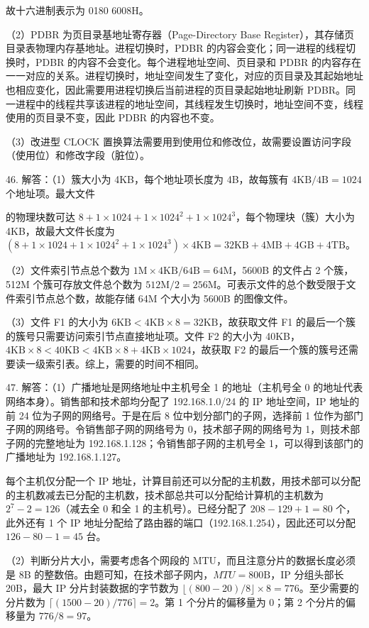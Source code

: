 \documentclass[UTF8,11pt]{ctexart}
\begin{document}
故十六进制表示为 0180 6008H。


（2）PDBR 为页目录基地址寄存器（Page-Directory Base Register），其存储页目录表物理内存基地址。进程切换时，PDBR 的内容会变化；同一进程的线程切换时，PDBR 的内容不会变化。每个进程地址空间、页目录和 PDBR 的内容存在一一对应的关系。进程切换时，地址空间发生了变化，对应的页目录及其起始地址也相应变化，因此需要用进程切换后当前进程的页目录起始地址刷新 PDBR。同一进程中的线程共享该进程的地址空间，其线程发生切换时，地址空间不变，线程使用的页目录不变，因此 PDBR 的内容也不变。


（3）改进型 CLOCK 置换算法需要用到使用位和修改位，故需要设置访问字段（使用位）和修改字段（脏位）。


46. 解答：（1）簇大小为 4KB，每个地址项长度为 4B，故每簇有 \(\displaystyle 4\mathrm{KB}/4\mathrm B=1024\) 个地址项。最大文件


的物理块数可达 \(\displaystyle 8+1\times1024+1\times1024^2+1\times1024^3\)，每个物理块（簇）大小为 4KB，故最大文件长度为 \(\displaystyle (8+1\times1024+1\times1024^2+1\times1024^3)\times4\mathrm{KB}=32\mathrm{KB}+4\mathrm{MB}+4\mathrm{GB}+4\mathrm{TB}\)。


（2）文件索引节点总个数为 \(\displaystyle 1\mathrm M\times4\mathrm{KB}/64\mathrm B=64\mathrm M\)，5600B 的文件占 2 个簇，512M 个簇可存放文件总个数为 \(\displaystyle 512\mathrm M/2=256\mathrm M\)。可表示文件的总个数受限于文件索引节点总个数，故能存储 64M 个大小为 5600B 的图像文件。


（3）文件 F1 的大小为 \(\displaystyle 6\mathrm{KB}<4\mathrm{KB}\times8=32\mathrm{KB}\)，故获取文件 F1 的最后一个簇的簇号只需要访问索引节点直接地址项。文件 F2 的大小为 40KB，\(\displaystyle 4\mathrm{KB}\times8<40\mathrm{KB}<4\mathrm{KB}\times8+4\mathrm{KB}\times1024\)，故获取 F2 的最后一个簇的簇号还需要读一级索引表。综上，需要的时间不相同。


47. 解答：（1）广播地址是网络地址中主机号全 1 的地址（主机号全 0 的地址代表网络本身）。销售部和技术部均分配了 192.168.1.0/24 的 IP 地址空间，IP 地址的前 24 位为子网的网络号。于是在后 8 位中划分部门的子网，选择前 1 位作为部门子网的网络号。令销售部子网的网络号为 0，技术部子网的网络号为 1，则技术部子网的完整地址为 192.168.1.128；令销售部子网的主机号全 1，可以得到该部门的广播地址为 192.168.1.127。


每个主机仅分配一个 IP 地址，计算目前还可以分配的主机数，用技术部可以分配的主机数减去已分配的主机数，技术部总共可以分配给计算机的主机数为 \(\displaystyle 2^7-2=126\)（减去全 0 和全 1 的主机号）。已经分配了 \(\displaystyle 208-129+1=80\) 个，此外还有 1 个 IP 地址分配给了路由器的端口（192.168.1.254），因此还可以分配 \(\displaystyle 126-80-1=45\) 台。


（2）判断分片大小，需要考虑各个网段的 MTU，而且注意分片的数据长度必须是 8B 的整数倍。由题可知，在技术部子网内，\(\displaystyle MTU=800\mathrm B\)，IP 分组头部长 20B，最大 IP 分片封装数据的字节数为 \(\displaystyle \lfloor(800-20)/8\rfloor\times8=776\)。至少需要的分片数为 \(\displaystyle \lceil(1500-20)/776\rceil=2\)。第 1 个分片的偏移量为 0；第 2 个分片的偏移量为 \(\displaystyle 776/8=97\)。
\end{document}
